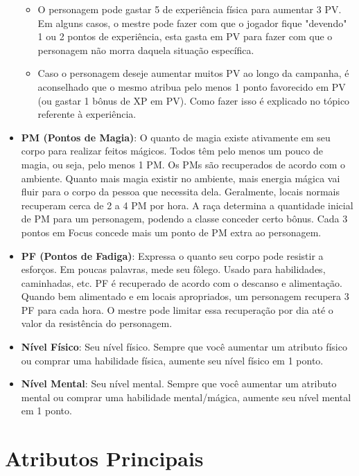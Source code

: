 \begin{itemize}
\begin{itemize}
\item O personagem pode gastar 5 de experiência física para aumentar 3 PV. Em alguns casos, o mestre pode fazer com que o jogador fique "devendo" 1 ou 2 pontos de experiência, esta gasta em PV para fazer com que o personagem não morra daquela situação específica.
\item Caso o personagem deseje aumentar muitos PV ao longo da campanha, é aconselhado que o mesmo atribua pelo menos 1 ponto favorecido em PV (ou gastar 1 bônus de XP em PV). Como fazer isso é explicado no tópico referente à experiência.
\end{itemize}


\item \textbf{PM (Pontos de Magia)}: O quanto de magia existe ativamente em seu corpo para realizar feitos mágicos. Todos têm pelo menos um pouco de magia, ou seja, pelo menos 1 PM. Os PMs são recuperados de acordo com o ambiente. Quanto mais magia existir no ambiente, mais energia mágica vai fluir para o corpo da pessoa que necessita dela. Geralmente, locais normais recuperam cerca de 2 a 4 PM por hora. 
A raça determina a quantidade inicial de PM para um personagem, podendo a classe conceder certo bônus. Cada 3 pontos em Focus concede mais um ponto de PM extra ao personagem.

\item \textbf{PF (Pontos de Fadiga)}: Expressa o quanto seu corpo pode resistir a esforços. Em poucas palavras, mede seu fôlego. Usado para habilidades, caminhadas, etc. PF é recuperado de acordo com o descanso e alimentação. Quando bem alimentado e em locais apropriados, um personagem recupera 3 PF para cada hora. O mestre pode limitar essa recuperação por dia até o valor da resistência do personagem.

\item \textbf{Nível Físico}: Seu nível físico. Sempre que você aumentar um atributo físico ou comprar uma habilidade física, aumente seu nível físico em 1 ponto.
\item \textbf{Nível Mental}: Seu nível mental. Sempre que você aumentar um atributo mental ou comprar uma habilidade mental/mágica, aumente seu nível mental em 1 ponto.

\end{itemize}

\section{Atributos Principais}

